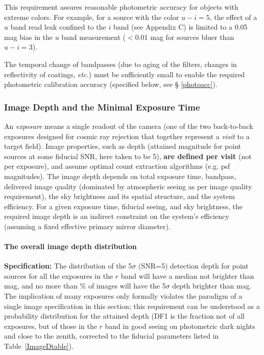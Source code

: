 This requirement assures reasonable photometric accuracy for objects with
extreme colors. For example, for a source with the color $u-i=5$, the
effect of a $u$ band read leak confined to the $i$ band (\eg see Appendix
C) is limited to a 0.05 mag bias in the $u$ band measurement ($<$0.01 mag
for sources bluer than $u-i=3$).

The temporal change of bandpasses (due to aging of the filters, changes in
reflectivity of coatings, {\it etc.}) must be sufficiently small to enable
the required photometric calibration accuracy (specified below, see \S
\ref{photoacc}).



\subsubsection{Image Depth and the Minimal Exposure Time}

An {\it exposure} means a single readout of the camera (one of the two
back-to-back exposures designed for cosmic ray rejection that together
represent a {\it visit} to a target field).  Image properties, such as
depth (attained magnitude for point sources at some fiducial SNR, here
taken to be 5), {\bf are defined per visit} (not per exposure), and
assume optimal count extraction algorithms (e.g. psf magnitudes). The image
depth depends on total exposure time, bandpass, delivered image quality
(dominated by atmospheric seeing as per image quality requirement), the sky
brightness and its spatial structure, and the system efficiency. For a
given exposure time, fiducial seeing, and sky brightness, the required
image depth is an indirect constraint on the system's efficiency (assuming
a fixed effective primary mirror diameter).


\paragraph{The overall image depth distribution\\}
\label{singleimagedepth}


{\bf Specification:} The distribution of the 5$\sigma$ (SNR=5) detection
depth for point sources for all the exposures in the $r$ band will have a
median not brighter than
mag, and no more than
\% of
images will have the 5$\sigma$ depth brighter than
mag. The implication
of many exposures only formally violates the paradigm of a single image
specification in this section; this requirement can be understood as a
probability distribution for the attained depth (DF1 is the fraction
not of all exposures, but of those in the $r$ band in good seeing on photometric
dark nights and close to the zenith, corrected to the fiducial parameters
listed in Table~\ref{ImageDtable}).

